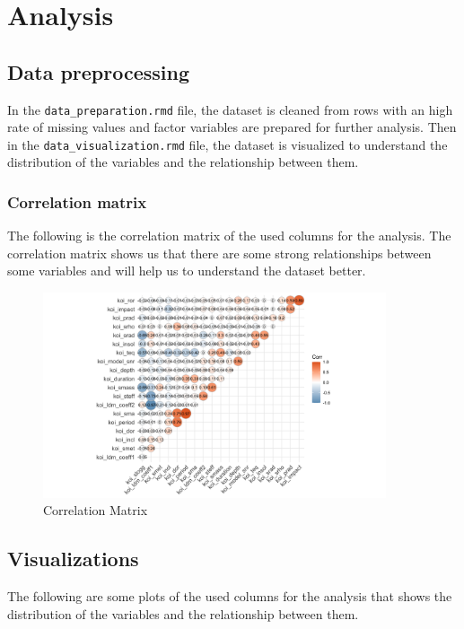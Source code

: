 \chapter{Analysis}
\section{Data preprocessing}
In the \texttt{data\_preparation.rmd} file, the dataset is cleaned from rows with an high rate of missing values and factor variables are prepared for further analysis. Then in the \texttt{data\_visualization.rmd} file, the dataset is visualized to understand the distribution of the variables and the relationship between them.
\subsection{Correlation matrix}
The following is the correlation matrix of the used columns for the analysis. The correlation matrix shows us that there are some strong relationships between some variables and will help us to understand the dataset better.
\begin{figure}[H]
    \centering
    \includegraphics[width=0.9\textwidth]{Immagini/cm.png}
    \caption{Correlation Matrix}
\end{figure}

\section{Visualizations}
The following are some plots of the used columns for the analysis that shows the distribution of the variables and the relationship between them.

